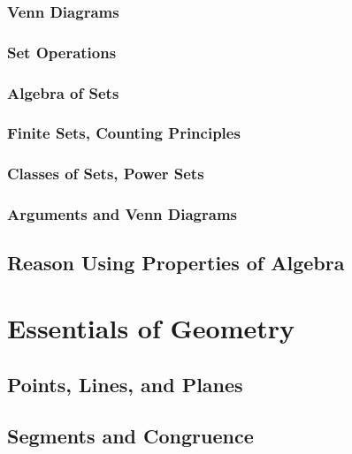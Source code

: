 \documentclass[]{book}
\begin{document}
\subsection{Venn Diagrams}\label{venn-diagrams}

\subsection{Set Operations}\label{set-operations}

\subsection{Algebra of Sets}\label{algebra-of-sets}

\subsection{Finite Sets, Counting
Principles}\label{finite-sets-counting-principles}

\subsection{Classes of Sets, Power
Sets}\label{classes-of-sets-power-sets}

\subsection{Arguments and Venn
Diagrams}\label{arguments-and-venn-diagrams}

\section{Reason Using Properties of
Algebra}\label{reason-using-properties-of-algebra}

\chapter{Essentials of Geometry}\label{essentials-of-geometry}

\section{Points, Lines, and Planes}\label{points-lines-and-planes}

\section{Segments and Congruence}\label{segments-and-congruence}
\end{document}
